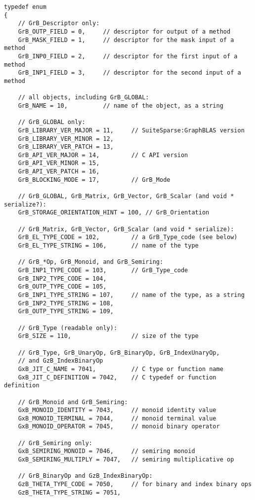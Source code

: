 {\footnotesize
\begin{verbatim}
typedef enum
{
    // GrB_Descriptor only:
    GrB_OUTP_FIELD = 0,     // descriptor for output of a method
    GrB_MASK_FIELD = 1,     // descriptor for the mask input of a method
    GrB_INP0_FIELD = 2,     // descriptor for the first input of a method
    GrB_INP1_FIELD = 3,     // descriptor for the second input of a method

    // all objects, including GrB_GLOBAL:
    GrB_NAME = 10,          // name of the object, as a string

    // GrB_GLOBAL only:
    GrB_LIBRARY_VER_MAJOR = 11,     // SuiteSparse:GraphBLAS version
    GrB_LIBRARY_VER_MINOR = 12,
    GrB_LIBRARY_VER_PATCH = 13,
    GrB_API_VER_MAJOR = 14,         // C API version
    GrB_API_VER_MINOR = 15,
    GrB_API_VER_PATCH = 16,
    GrB_BLOCKING_MODE = 17,         // GrB_Mode

    // GrB_GLOBAL, GrB_Matrix, GrB_Vector, GrB_Scalar (and void * serialize?):
    GrB_STORAGE_ORIENTATION_HINT = 100, // GrB_Orientation

    // GrB_Matrix, GrB_Vector, GrB_Scalar (and void * serialize):
    GrB_EL_TYPE_CODE = 102,         // a GrB_Type_code (see below)
    GrB_EL_TYPE_STRING = 106,       // name of the type

    // GrB_*Op, GrB_Monoid, and GrB_Semiring:
    GrB_INP1_TYPE_CODE = 103,       // GrB_Type_code
    GrB_INP2_TYPE_CODE = 104,
    GrB_OUTP_TYPE_CODE = 105,
    GrB_INP1_TYPE_STRING = 107,     // name of the type, as a string
    GrB_INP2_TYPE_STRING = 108,
    GrB_OUTP_TYPE_STRING = 109,

    // GrB_Type (readable only):
    GrB_SIZE = 110,                 // size of the type

    // GrB_Type, GrB_UnaryOp, GrB_BinaryOp, GrB_IndexUnaryOp,
    // and GzB_IndexBinaryOp
    GxB_JIT_C_NAME = 7041,          // C type or function name
    GxB_JIT_C_DEFINITION = 7042,    // C typedef or function definition

    // GrB_Monoid and GrB_Semiring:
    GxB_MONOID_IDENTITY = 7043,     // monoid identity value
    GxB_MONOID_TERMINAL = 7044,     // monoid terminal value
    GxB_MONOID_OPERATOR = 7045,     // monoid binary operator

    // GrB_Semiring only:
    GxB_SEMIRING_MONOID = 7046,     // semiring monoid
    GxB_SEMIRING_MULTIPLY = 7047,   // semiring multiplicative op

    // GrB_BinaryOp and GzB_IndexBinaryOp:
    GzB_THETA_TYPE_CODE = 7050,     // for binary and index binary ops
    GzB_THETA_TYPE_STRING = 7051,


\end{verbatim}}
